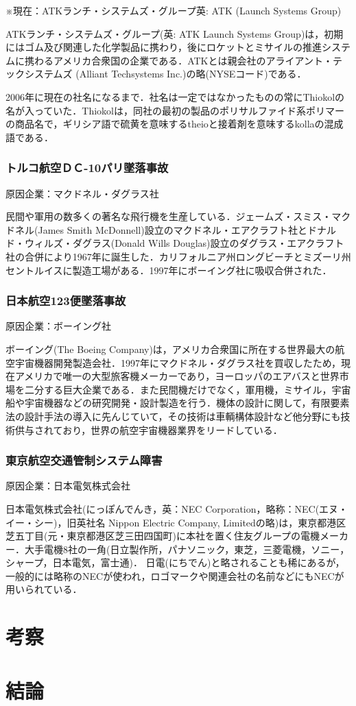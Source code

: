 ※現在：ATKランチ・システムズ・グループ英: ATK (Launch Systems Group)  

ATKランチ・システムズ・グループ(英: ATK Launch Systems Group)は，初期にはゴム及び関連した化学製品に携わり，後にロケットとミサイルの推進システムに携わるアメリカ合衆国の企業である．ATKとは親会社のアライアント・テックシステムズ (Alliant Techsystems Inc.)の略(NYSEコード)である．

2006年に現在の社名になるまで．社名は一定ではなかったものの常にThiokolの名が入っていた．Thiokolは，同社の最初の製品のポリサルファイド系ポリマーの商品名で，ギリシア語で硫黄を意味するtheioと接着剤を意味するkollaの混成語である\cite{saiokoru}．
\subsection{トルコ航空ＤＣ-10パリ墜落事故}
原因企業：マクドネル・ダグラス社

民間や軍用の数多くの著名な飛行機を生産している．ジェームズ・スミス・マクドネル(James Smith McDonnell)設立のマクドネル・エアクラフト社とドナルド・ウィルズ・ダグラス(Donald Wills Douglas)設立のダグラス・エアクラフト社の合併により1967年に誕生した．カリフォルニア州ロングビーチとミズーリ州セントルイスに製造工場がある．1997年にボーイング社に吸収合併された\cite{dagurasu}．
\subsection{日本航空123便墜落事故}
原因企業：ボーイング社

ボーイング(The Boeing Company)は，アメリカ合衆国に所在する世界最大の航空宇宙機器開発製造会社．1997年にマクドネル・ダグラス社を買収したため，現在アメリカで唯一の大型旅客機メーカーであり，ヨーロッパのエアバスと世界市場を二分する巨大企業である．また民間機だけでなく，軍用機，ミサイル，宇宙船や宇宙機器などの研究開発・設計製造を行う．機体の設計に関して，有限要素法の設計手法の導入に先んじていて，その技術は車輌構体設計など他分野にも技術供与されており，世界の航空宇宙機器業界をリードしている\cite{boing}．
\subsection{東京航空交通管制システム障害}
原因企業：日本電気株式会社

日本電気株式会社(にっぽんでんき，英：NEC Corporation，略称：NEC(エヌ・イー・シー)，旧英社名 Nippon Electric Company, Limitedの略)は，東京都港区芝五丁目(元・東京都港区芝三田四国町)に本社を置く住友グループの電機メーカー．大手電機8社の一角(日立製作所，パナソニック，東芝，三菱電機，ソニー，シャープ，日本電気，富士通)．
日電(にちでん)と略されることも稀にあるが，一般的には略称のNECが使われ，ロゴマークや関連会社の名前などにもNECが用いられている\cite{nihondenki}．
\chapter{考察}

\chapter{結論}








